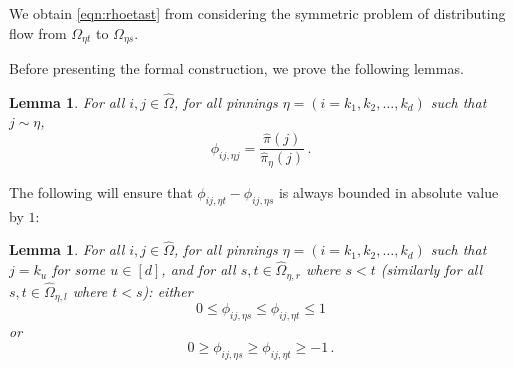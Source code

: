 \documentclass[a4paper, 12p]{article}
\numberwithin{equation}{section}
\newcommand{\Omorproj}{\hat{\Omega}}
\newcommand{\piorproj}{\hat{\pi}}
\newtheorem{lemma}[theorem]{Lemma}
\begin{document}
We obtain \eqref{eqn:rhoetast} from considering the symmetric problem of distributing flow from $\Omega_{\eta t}$ to $\Omega_{\eta s}$.

Before presenting the formal construction, we prove the following lemmas.
\begin{lemma}
    For all $i,j\in\Omorproj$, for all pinnings $\eta = (i = k_1, k_2, \dots, k_d)$ such that $j \sim \eta$,
    \[
      \phi_{ij,\eta j} = \frac{\piorproj(j)}{\piorproj_{\eta}(j)}\,.
    \]
    \label{lem:rhoj1}
\end{lemma}

The following will ensure that $\phi_{ij,\eta t} - \phi_{ij,\eta s}$ is always bounded in absolute value by $1$:
\begin{lemma}
For all $i,j\in\Omorproj$, for all pinnings $\eta = (i = k_1, k_2, \dots, k_d)$ such that $j = k_u$  for some $u \in [d]$, and for all $s, t \in \Omorproj_{\eta,r}$ where $s < t$ (similarly for all $s, t \in \Omorproj_{\eta, l}$ where $t < s$):
either
\begin{equation}
    0 \leq \phi_{ij, \eta s} \leq \phi_{ij, \eta t} \leq 1 \label{eqn:mono+}
\end{equation}
or
\begin{equation}
    0 \geq \phi_{ij, \eta s} \geq \phi_{ij, \eta t} \geq -1\,. \label{eqn:mono-}
\end{equation}
\label{lem:rholeq1}
\end{lemma}
\end{document}
